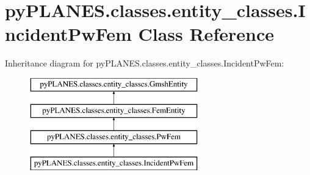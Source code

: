 \hypertarget{classpy_p_l_a_n_e_s_1_1classes_1_1entity__classes_1_1_incident_pw_fem}{}\section{py\+P\+L\+A\+N\+E\+S.\+classes.\+entity\+\_\+classes.\+Incident\+Pw\+Fem Class Reference}
\label{classpy_p_l_a_n_e_s_1_1classes_1_1entity__classes_1_1_incident_pw_fem}
Inheritance diagram for py\+P\+L\+A\+N\+E\+S.\+classes.\+entity\+\_\+classes.\+Incident\+Pw\+Fem\+:\begin{figure}[H]
\begin{center}
\leavevmode
\includegraphics[height=4.000000cm]{classpy_p_l_a_n_e_s_1_1classes_1_1entity__classes_1_1_incident_pw_fem}
\end{center}
\end{figure}
